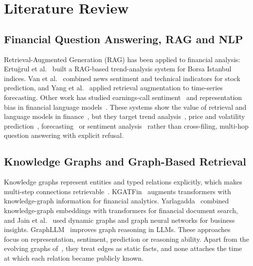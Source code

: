 \documentclass[conference]{IEEEtran}
\begin{document}
\section{Literature Review}
\subsection{Financial Question Answering, RAG and NLP}
Retrieval-Augmented Generation (RAG) has been applied to financial analysis: Ertu\u{g}rul et al.~\cite{ertugrul2026rag} built a RAG-based trend-analysis system for Borsa Istanbul indices. Van et al.~\cite{van2026llmstock} combined news sentiment and technical indicators for stock prediction, and Yang et al.~\cite{yang2025timerag} applied retrieval augmentation to time-series forecasting. Other work has studied earnings-call sentiment~\cite{icocics2025earnings} and representation bias in financial language models~\cite{sabuncuoglu2025bias}. These systems show the value of retrieval and language models in finance~\cite{ertugrul2026rag,van2026llmstock,yang2025timerag,icocics2025earnings,sabuncuoglu2025bias}, but they target trend analysis~\cite{ertugrul2026rag}, price and volatility prediction~\cite{van2026llmstock}, forecasting~\cite{yang2025timerag} or sentiment analysis~\cite{icocics2025earnings,sabuncuoglu2025bias} rather than cross-filing, multi-hop question answering with explicit refusal.

\subsection{Knowledge Graphs and Graph-Based Retrieval}
Knowledge graphs represent entities and typed relations explicitly, which makes multi-step connections retrievable~\cite{yarlagadda2026kg,chai2026graphllm}. KGATFin~\cite{yahathugoda2026kgatfin} augments transformers with knowledge-graph information for financial analytics. Yarlagadda~\cite{yarlagadda2026kg} combined knowledge-graph embeddings with transformers for financial document search, and Jain et al.~\cite{jain2025dynamic} used dynamic graphs and graph neural networks for business insights. GraphLLM~\cite{chai2026graphllm} improves graph reasoning in LLMs. These approaches~\cite{yahathugoda2026kgatfin,yarlagadda2026kg,jain2025dynamic,chai2026graphllm} focus on representation, sentiment, prediction or reasoning ability. Apart from the evolving graphs of~\cite{jain2025dynamic}, they treat edges as static facts, and none attaches the time at which each relation became publicly known.
\end{document}
